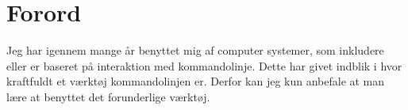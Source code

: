 \chapter*{Forord}
Jeg har igennem mange år benyttet mig af computer systemer, som inkludere eller er baseret på interaktion med kommandolinje. Dette har givet indblik i hvor kraftfuldt et værktøj kommandolinjen er. Derfor kan jeg kun anbefale at man lære at benyttet det forunderlige værktøj.